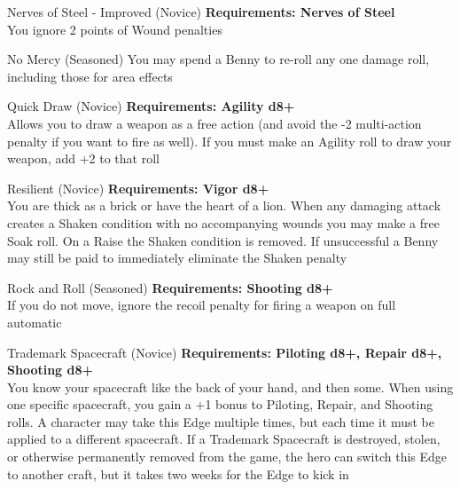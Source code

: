 \begin{multicols}{2}
\begin{genericsection}{Nerves of Steel - Improved (Novice)}
\textbf{Requirements: Nerves of Steel}\\
You ignore 2 points of Wound penalties
\end{genericsection}

\begin{genericsection}{No Mercy (Seasoned)}
You may spend a Benny to re-roll any one damage roll, including those for area effects
\end{genericsection}

\begin{genericsection}{Quick Draw (Novice)}
\textbf{Requirements: Agility d8+}\\
Allows you to draw a weapon as a free action (and avoid the -2 multi-action penalty if you want to fire as well). If you must make an Agility roll to draw your weapon, add +2 to that roll
\end{genericsection}

\begin{genericsection}{Resilient (Novice)}
\textbf{Requirements: Vigor d8+}\\
You are thick as a brick or have the heart of a lion. When any damaging attack creates a Shaken condition with no accompanying wounds you may make a free Soak roll. On a Raise the Shaken condition is removed. If unsuccessful a Benny may still be paid to immediately eliminate the Shaken penalty
\end{genericsection}

\begin{genericsection}{Rock and Roll (Seasoned)}
\textbf{Requirements: Shooting d8+}\\
If you do not move, ignore the recoil penalty for firing a weapon on full automatic
\end{genericsection}

\begin{genericsection}{Trademark Spacecraft (Novice)}
\textbf{Requirements: Piloting d8+, Repair d8+, Shooting d8+}\\
You know your spacecraft like the back of your hand, and then some. When using one specific spacecraft, you gain a +1 bonus to Piloting, Repair, and Shooting rolls. A character may take this Edge multiple times, but each time it must be applied to a different spacecraft. If a Trademark Spacecraft is destroyed, stolen, or otherwise permanently removed from the game,
the hero can switch this Edge to another craft, but it takes two weeks for the Edge to kick in
\end{genericsection}


\end{multicols}
